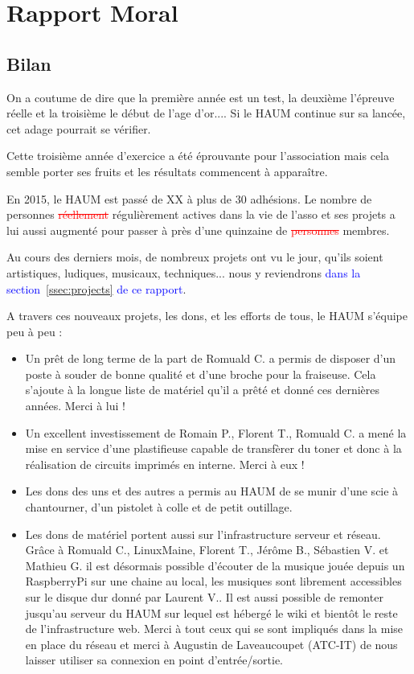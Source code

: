 \documentclass[11pt]{article}
\newcommand{\fs}[1]{\textcolor{red}{\sout{#1}}}
\newcommand{\f}[1]{\textcolor{blue}{#1}}
\begin{document}
\section{Rapport Moral}


\subsection{Bilan}

On a coutume de dire que la première année est un test, la deuxième l'épreuve réelle et la troisième le début de l'age
d'or.... Si le HAUM continue sur sa lancée, cet adage pourrait se vérifier.

Cette troisième année d'exercice a été éprouvante pour l'association mais cela semble porter ses fruits et les résultats
commencent à apparaître.

En 2015, le HAUM est passé de XX à plus de 30 adhésions. Le nombre de personnes \fs{réellement} r\'eguli\`erement actives dans la vie de l'asso
et ses projets a lui aussi augmenté pour passer à près d'une quinzaine de \fs{personnes} membres.

Au cours des derniers mois, de nombreux projets ont vu le jour, qu'ils soient artistiques, ludiques, musicaux,
techniques... nous y reviendrons \f{dans la section~\ref{ssec:projects} de ce rapport}.

A travers ces nouveaux projets, les dons, et les efforts de tous, le HAUM s'équipe peu à peu :

\begin{itemize}
	\item Un prêt de long terme de la part de Romuald C. a permis de disposer d'un poste à souder de bonne qualité et
		d'une broche pour la fraiseuse. Cela s'ajoute à la longue liste de matériel qu'il a prêté et donné ces dernières
		années. Merci à lui !
	\item Un excellent investissement de Romain P., Florent T., Romuald C. a mené la mise en service d'une plastifieuse
		capable de transfèrer du toner et donc à la réalisation de circuits imprimés en interne. Merci à eux !
	\item Les dons des uns et des autres a permis au HAUM de se munir d'une scie à chantourner, d'un pistolet à colle et
		de petit outillage.
	\item Les dons de matériel portent aussi sur l'infrastructure serveur et réseau. Grâce à Romuald C., LinuxMaine,
		Florent T., Jérôme B., Sébastien V. et Mathieu G. il est désormais possible d'écouter de la musique jouée depuis un
		RaspberryPi sur une chaine au local, les musiques sont librement accessibles sur le disque dur donné par Laurent
		V.. Il est aussi possible de remonter jusqu'au serveur du HAUM sur lequel est hébergé le wiki et bientôt le
		reste de l'infrastructure web. Merci à tout ceux qui se sont impliqués dans la mise en place du réseau et merci
		à Augustin de Laveaucoupet (ATC-IT) de nous laisser utiliser sa connexion en point d'entrée/sortie.
\end{itemize}
\end{document}
